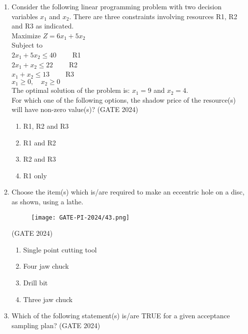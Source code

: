 \documentclass[journal,12pt,onecolumn]{IEEEtran}
\theoremstyle{remark}
\begin{document}
\begin{enumerate}
\item Consider the following linear programming problem with two decision variables $x_1$ and $x_2$. There are three constraints involving resources R1, R2 and R3 as indicated.\\
Maximize $Z = 6x_1 + 5x_2$\\
Subject to\\
$2x_1 + 5x_2 \leq 40 \qquad$ R1\\
$2x_1 + x_2 \leq 22 \qquad$ R2\\
$x_1 + x_2 \leq 13 \qquad$ R3\\
$x_1 \geq 0, \quad x_2 \geq 0$\\
The optimal solution of the problem is: $x_1=9$ and $x_2=4$.\\
For which one of the following options, the shadow price of the resource(s) will have non-zero value(s)?
\hfill{(GATE 2024)}
\begin{multicols}{4}
\begin{enumerate}
    \item R1, R2 and R3
    \item R1 and R2
    \item R2 and R3
    \item R1 only
\end{enumerate}
\end{multicols}
\vspace{1cm}

\item Choose the item(s) which is/are required to make an eccentric hole on a disc, as shown, using a lathe.
\begin{figure}[H]
    \centering
    \texttt{[image: GATE-PI-2024/43.png]}
    \caption{}
    \label{fig:eccentrichole}
\end{figure}
\hfill{(GATE 2024)}

\begin{enumerate}
    \item Single point cutting tool
    \item Four jaw chuck
    \item Drill bit
    \item Three jaw chuck
\end{enumerate}

\vspace{1cm}
\newpage
\item Which of the following statement(s) is/are TRUE for a given acceptance sampling plan?
\hfill{(GATE 2024)}


\end{enumerate}
\end{document}
